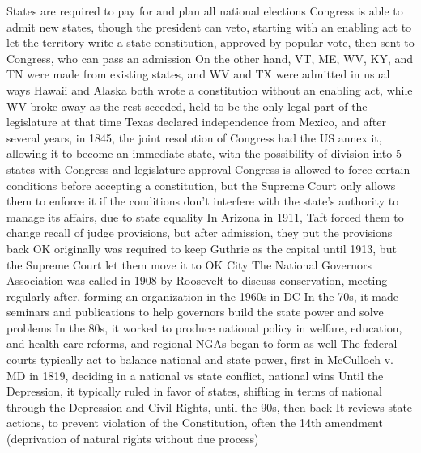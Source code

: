 \documentclass[11 pt, twoside]{article}
\newenvironment{outline*}
{
	\begin{outline}[enumerate]
	}
	{\end{outline}
}
\begin{document}
\begin{outline*}
\2 States are required to pay for and plan all national elections
\1 Congress is able to admit new states, though the president can veto, starting with an enabling act to let the territory write a state constitution, approved by popular vote, then sent to Congress, who can pass an admission
\2 On the other hand, VT, ME, WV, KY, and TN were made from existing states, and WV and TX were admitted in usual ways
\2 Hawaii and Alaska both wrote a constitution without an enabling act, while WV broke away as the rest seceded, held to be the only legal part of the legislature at that time
\2 Texas declared independence from Mexico, and after several years, in 1845, the joint resolution of Congress had the US annex it, allowing it to become an immediate state, with the possibility of division into 5 states with Congress and legislature approval
\1 Congress is allowed to force certain conditions before accepting a constitution, but the Supreme Court only allows them to enforce it if the conditions don’t interfere with the state’s authority to manage its affairs, due to state equality
\2 In Arizona in 1911, Taft forced them to change recall of judge provisions, but after admission, they put the provisions back
\2 OK originally was required to keep Guthrie as the capital until 1913, but the Supreme Court let them move it to OK City
\1 The National Governors Association was called in 1908 by Roosevelt to discuss conservation, meeting regularly after, forming an organization in the 1960s in DC
\2 In the 70s, it made seminars and publications to help governors build the state power and solve problems
\2 In the 80s, it worked to produce national policy in welfare, education, and health-care reforms, and regional NGAs began to form as well
\1 The federal courts typically act to balance national and state power, first in McCulloch v. MD in 1819, deciding in a national vs state conflict, national wins
\2 Until the Depression, it typically ruled in favor of states, shifting in terms of national through the Depression and Civil Rights, until the 90s, then back
\2 It reviews state actions, to prevent violation of the Constitution, often the 14th amendment (deprivation of natural rights without due process)
\end{outline*}
\end{document}
